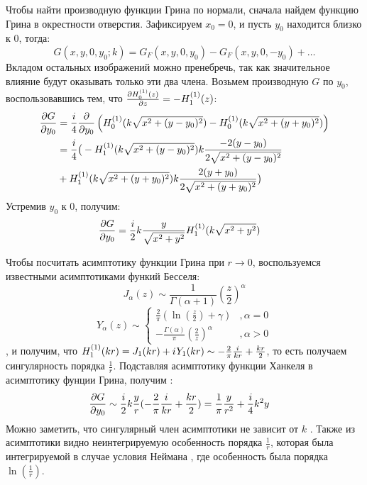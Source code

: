Чтобы найти производную функции Грина по нормали, сначала найдем функцию Грина в окрестности отверстия. Зафиксируем $x_0 = 0$, и пусть $y_0$ находится близко к $0$, тогда:
\[
G(x, y, 0, y_0; k) = G_F(x, y, 0, y_0) - G_F(x, y, 0, -y_0) + \dots
\]
Вкладом остальных изображений можно пренебречь, так как значительное влияние будут оказывать только эти два члена. Возьмем производную $G$ по $y_0$, воспользовавшись тем, что $\pdv{H_{0}^{(1)}(z)}{z} = - H_{1}^{(1)}(z)$:
\begin{align*}
\pdv{G}{y_0}
&= \frac{i}{4} \pdv{}{y_0} \left( H_{0}^{(1)}(k \sqrt{x^2 + (y - y_0)^2}) - H_{0}^{(1)}(k \sqrt{x^2 + (y + y_0)^2}) \right) \\
&= \frac{i}{4} \big( -H_{1}^{(1)}(k \sqrt{x^2 + (y - y_0)^2}) k \frac{-2 (y - y_0)}{2 \sqrt{x^2 + (y - y_0)^2}} \\
&+ H_{1}^{(1)}(k \sqrt{x^2 + (y + y_0)^2}) k \frac{2 (y + y_0)}{2 \sqrt{x^2 + (y + y_0)^2}} \big)
\end{align*}
Устремив $y_0$ к 0, получим:
\begin{align*}
\pdv{G}{y_0} (x, y, 0, 0; k)
&= \frac{i}{2} k \frac{y}{\sqrt{x^2 + y^2}} H_{1}^{(1)}(k \sqrt{x^2 + y^2})
\end{align*}

Чтобы посчитать асимптотику функции Грина при $r \to 0$, воспользуемся известными асимптотиками функий Бесселя:
\[
J_\alpha(z) \sim \frac{1}{\Gamma(\alpha+1)} \left( \frac{z}{2} \right) ^\alpha
\]
\[
Y_\alpha(z) \sim
\begin{cases}
\frac{2}{\pi} \left ( \ln \left (\frac{z}{2} \right ) + \gamma \right )  &, \alpha=0\\
-\frac{\Gamma(\alpha)}{\pi} \left( \frac{2}{z} \right) ^\alpha &, \alpha > 0
\end{cases}
\]
, и получим, что $H_{1}^{(1)}(k r) = J_1(k r) + {i\mkern1mu} Y_1(k r) \sim - \frac{2}{\pi} \frac{{i\mkern1mu} }{k r} + \frac{k r}{2}$, то есть получаем сингулярность порядка $\frac{1}{r}$. Подставляя асимптотику функции Ханкеля в асимптотику фунции Грина, получим :
\begin{align*}
\pdv{G}{y_0} (x, y, 0, 0; k)
&\sim \frac{i}{2} k \frac{y}{r} (- \frac{2}{\pi} \frac{{i\mkern1mu} }{k r} + \frac{k r}{2}) = \frac{1}{\pi} \frac{y}{r^2} + \frac{i}{4} k^2 y
\end{align*} 
Можно заметить, что сингулярный член асимптотики не зависит от $k$ . Также из асимптотики видно неинтегрируемую особенность порядка $\frac{1}{r}$, которая была интегрируемой в случае условия Неймана , где особенность была порядка $\ln(\frac{1}{r})$.


